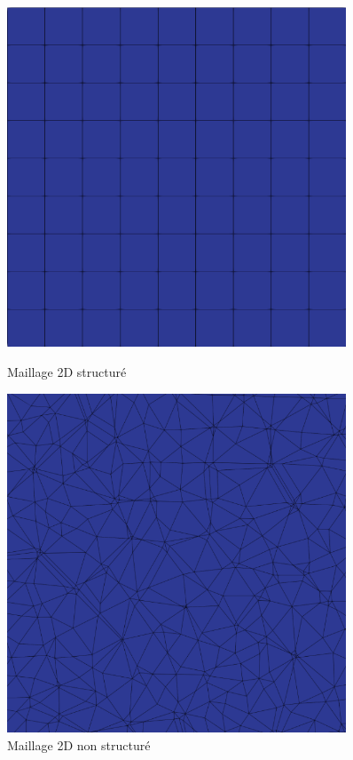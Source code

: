 \begin{figure}[H]
    \centering
    \begin{minipage}[t]{0.495\textwidth}
        \centering
        \includegraphics[width=0.9\textwidth]{images/structure.png} %
        \caption{Maillage 2D structuré}
        \label{fig:maillage_structure}
    \end{minipage}
    \hfill
    \begin{minipage}[t]{0.495\textwidth}
        \centering
        \includegraphics[width=0.9\textwidth]{images/non_structure.png} %
        \caption{Maillage 2D non structuré}
        \label{fig:maillage_non_structure}
    \end{minipage}
\end{figure}



